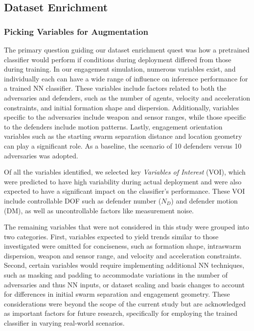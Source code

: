 \documentclass[journal]{IEEEtran} %
\begin{document}
\subsection{Dataset Enrichment}
\label{sec:dataset enrichment}


\subsubsection{Picking Variables for Augmentation}
The primary question guiding our dataset enrichment quest was how a pretrained classifier would perform if conditions during deployment differed from those during training. In our engagement simulation, numerous variables exist, and individually each can have a wide range of influence on inference performance for a trained NN classifier. These variables include factors related to both the adversaries and defenders, such as the number of agents, velocity and acceleration constraints, and initial formation shape and dispersion. Additionally, variables specific to the adversaries include weapon and sensor ranges, while those specific to the defenders include motion patterns. Lastly, engagement orientation variables such as the starting swarm separation distance and location geometry can play a significant role. As a baseline, the scenario of 10 defenders versus 10 adversaries was adopted.

Of all the variables identified, we selected key \textit{Variables of Interest} (VOI), which were predicted to have high variability during actual deployment and were also expected to have a significant impact on the classifier's performance. These VOI include controllable DOF such as defender number ($N_D$) and defender motion (DM), as well as uncontrollable factors like measurement noise.

The remaining variables that were not considered in this study were grouped into two categories. First, variables expected to yield trends similar to those investigated were omitted for conciseness, such as formation shape, intraswarm dispersion, weapon and sensor range, and velocity and acceleration constraints. Second, certain variables would require implementing additional NN techniques, such as masking and padding to accommodate variations in the number of adversaries and thus NN inputs, or dataset scaling and basis changes to account for differences in initial swarm separation and engagement geometry. These considerations were beyond the scope of the current study but are acknowledged as important factors for future research, specifically for employing the trained classifier in varying real-world scenarios.
\end{document}
